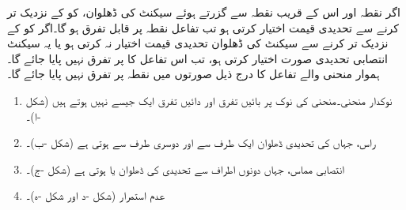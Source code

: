 اگر نقطہ  اور اس کے قریب نقطہ  سے گزرتے ہوئے سیکنٹ کی ڈھلوان،  کو  کے نزدیک تر کرنے سے تحدیدی قیمت اختیار کرتی ہو  تب تفاعل  نقطہ  پر قابل تفرق ہو گا۔اگر  کو  کے نزدیک تر کرنے سے سیکنٹ کی ڈھلوان  تحدیدی قیمت اختیار نہ کرتی ہو یا یہ سیکنٹ انتصابی تحدیدی صورت اختیار کرتی ہو، تب اس تفاعل کا  پر تفرق نہیں پایا جائے گا۔ہموار منحنی والے تفاعل کا درج ذیل صورتوں میں نقطہ  پر تفرق نہیں پایا جائے گا۔
\begin{enumerate}[1.]
\item
نوکدار منحنی۔منحنی کی نوک  پر بائیں تفرق اور دائیں تفرق ایک جیسے نہیں ہوتے ہیں (شکل -ا)۔
\item
راس، جہاں  کی تحدیدی ڈھلوان ایک طرف سے  اور دوسری طرف سے  ہوتی ہے (شکل -ب)۔ 
\item
انتصابی مماس، جہاں دونوں اطراف سے تحدیدی  کی ڈھلوان  یا  ہوتی ہے (شکل -ج)۔
\item
عدم استمرار (شکل -د اور شکل -ہ)۔
\end{enumerate}

